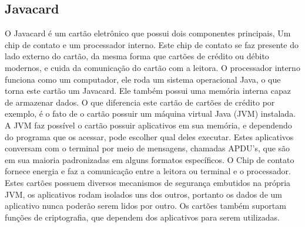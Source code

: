 \documentclass{article}
\begin{document}
	\subsection{Javacard\cite{JAVACHEN}}
		\begin{justify}
			

				\hspace{2cm} O Javacard é um cartão eletrônico que possui dois componentes principais, Um chip de contato e um processador interno. Este chip de contato se faz presente do lado externo do cartão, da mesma forma que cartões de crédito ou débito modernos, e cuida da comunicação do cartão com a leitora. O processador interno funciona como um computador, ele roda um sistema operacional Java, o que torna este cartão um Javacard. Ele também possui uma memória interna capaz de armazenar dados. O que diferencia este cartão de cartões de crédito por exemplo, é o fato de o cartão possuir um máquina virtual Java (JVM) instalada. A JVM faz possível o cartão possuir aplicativos em sua memória, e dependendo do programa que os acessar, pode escolher qual deles executar. Estes aplicativos conversam com o terminal por meio de mensagens, chamadas APDU's, que são em sua maioria padronizadas em alguns formatos específicos. O Chip de contato fornece energia e faz a comunicação entre a leitora ou terminal e o processador. Estes cartões possuem diversos mecanismos de segurança embutidos na própria JVM, os aplicativos rodam isolados uns dos outros, portanto os dados de um aplicativo nunca poderão serem lidos por outro. Os cartões também suportam funções de criptografia, que dependem dos aplicativos para serem utilizadas.

			
		\end{justify}
\end{document}
